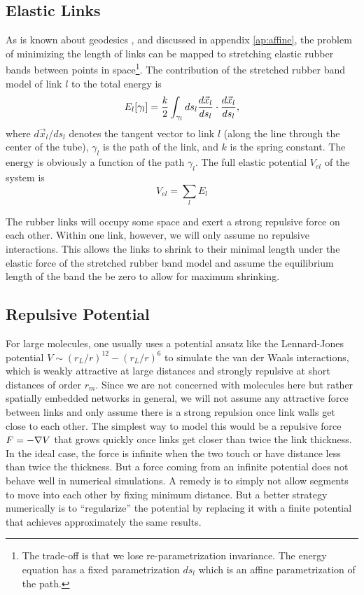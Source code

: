 \documentclass[endfloats,nofootinbib,preprint,floatfix,titlepage,superscriptaddress,linenumbers]{revtex4-1} %
\begin{document}
\subsection{Elastic Links}
As is known about geodesics \citep{novikov1984}, and discussed in appendix \ref{ap:affine}, the problem of minimizing the length of links can be mapped to stretching elastic rubber bands between points in space\footnote{The trade-off is that we lose re-parametrization invariance. The energy equation has a fixed parametrization $ds_l$ which is an affine parametrization of the path.}. The contribution of the stretched rubber band model of link $l$ to the total energy is
\begin{equation}
  E_l[\gamma_l] = {k\over 2}\int_{\gamma_l} ds_l {d\vec{x}_l\over ds_l} \cdot {d\vec{x}_l\over ds_l}, \label{eq:El}
\end{equation}
where $d\vec{x}_l/ds_l$ denotes the tangent vector to link $l$ (along the line through the center of the tube), $\gamma_l$ is the path of the link, and $k$ is the spring constant. 
The energy is obviously a function of the path $\gamma_l$. 
The full elastic potential $V_{el}$ of the system is
\begin{equation}
    V_{el} = \sum_l E_l
\end{equation}

The rubber links will occupy some space and exert a strong repulsive force on each other. Within one link, however, we will only assume no repulsive interactions. This allows the links to shrink to their minimal length under the elastic force of the stretched rubber band model and assume the equilibrium length of the band the be zero to allow for maximum shrinking. 

\subsection{Repulsive Potential\label{ap:repel}}

For large molecules, one usually uses a potential ansatz like the Lennard-Jones potential $V \sim (r_L/r)^{12} - (r_L/r)^6 $ to simulate the van der Waals interactions, which is weakly attractive at large distances and strongly repulsive at short distances of order $r_m$. Since we are not concerned with molecules here but rather spatially embedded networks in general, we will not assume any attractive force between links and only assume there is a strong repulsion once link walls get close to each other. The simplest way to model this would be a repulsive force $F = -\nabla V$ that grows quickly once links get closer than twice the link thickness. In the ideal case, the force is infinite when the two touch or have distance less than twice the thickness. But a force coming from an infinite potential does not behave well in numerical simulations. A remedy is to simply not allow segments to move into each other by fixing minimum distance. But a better strategy numerically is to ``regularize'' the potential by replacing it with a finite potential that achieves approximately the same results. 
\end{document}
